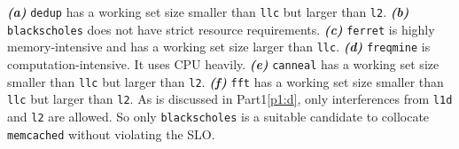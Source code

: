 

\emph{\textbf{(a)}} \texttt{dedup} has a working set size smaller than  \texttt{llc} but larger than \texttt{l2}.
\emph{\textbf{(b)}} \texttt{blackscholes} does not have strict resource requirements.
\emph{\textbf{(c)}} \texttt{ferret} is highly memory-intensive and has a working set size larger than \texttt{llc}.
\emph{\textbf{(d)}} \texttt{freqmine} is computation-intensive. It uses CPU heavily.
\emph{\textbf{(e)}} \texttt{canneal} has a working set size smaller than \texttt{llc} but larger than \texttt{l2}.
\emph{\textbf{(f)}} \texttt{fft} has a working set size smaller than \texttt{llc} but larger than \texttt{l2}.
As is discussed in Part1\ref{p1:d}, only interferences from \texttt{l1d} and \texttt{l2} are allowed. So
only \texttt{blackscholes} is a suitable candidate to collocate \texttt{memcached} without violating the SLO.